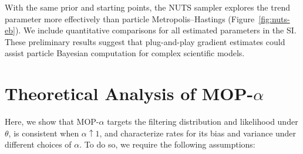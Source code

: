 \documentclass[11pt]{article}
\begin{document}
With the same prior and starting points, the NUTS sampler explores the trend parameter more effectively than particle Metropolis--Hastings (Figure~\ref{fig:nuts-eb}). We include quantitative comparisons for all estimated parameters in the SI. These preliminary results suggest that plug-and-play gradient estimates could assist particle Bayesian computation for complex scientific models.


\section{Theoretical Analysis of MOP-$\alpha$}
\label{sec:thms}

Here, we show that MOP-$\alpha$ targets the filtering distribution and likelihood under $\theta$, is consistent when $\alpha \uparrow 1$, and characterize rates for its bias and variance under different choices of $\alpha$. To do so, we require the following assumptions:
\end{document}
